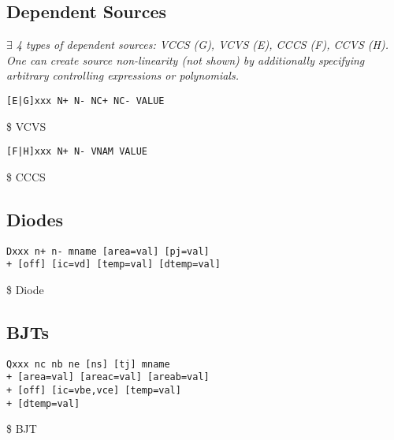 \subsection*{Dependent Sources}
\textit{$\exists$ 4 types of dependent sources: VCCS (G), VCVS (E), CCCS (F), CCVS (H). One can create source non-linearity (not shown) by additionally specifying arbitrary controlling expressions or polynomials.}\\
\begin{lstlisting}
[E|G]xxx N+ N- NC+ NC- VALUE 
\end{lstlisting}
 \$ VCVS \\
\begin{lstlisting}
[F|H]xxx N+ N- VNAM VALUE 
\end{lstlisting}
 \$ CCCS \\


\subsection*{Diodes}
\begin{lstlisting}
Dxxx n+ n- mname [area=val] [pj=val] 
+ [off] [ic=vd] [temp=val] [dtemp=val]
\end{lstlisting}
 \$ Diode \\


\subsection*{BJTs}

\begin{lstlisting}
Qxxx nc nb ne [ns] [tj] mname 
+ [area=val] [areac=val] [areab=val]
+ [off] [ic=vbe,vce] [temp=val]
+ [dtemp=val]
\end{lstlisting}
 \$ BJT \\


